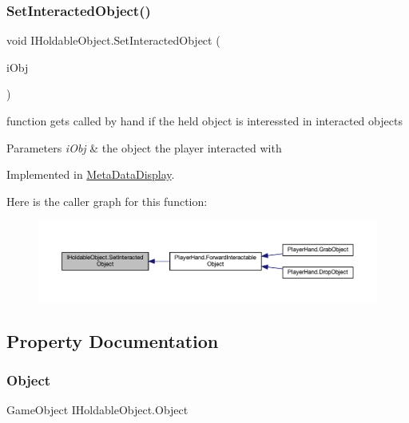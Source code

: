 \subsubsection{\texorpdfstring{Set\+Interacted\+Object()}{SetInteractedObject()}}
{\footnotesize\ttfamily void I\+Holdable\+Object.\+Set\+Interacted\+Object (\begin{DoxyParamCaption}\item[{\mbox{\hyperlink{interface_i_interactable}{I\+Interactable}}}]{i\+Obj }\end{DoxyParamCaption})}





function get\textquotesingle{}s called by hand if the held object is interessted in interacted objects 


\begin{DoxyParams}{Parameters}
{\em i\+Obj} & the object the player interacted with\\
\hline
\end{DoxyParams}


Implemented in \mbox{\hyperlink{class_meta_data_display_a29b7b1ec6193b73606dc7da89c387529}{Meta\+Data\+Display}}.

Here is the caller graph for this function\+:
\nopagebreak
\begin{figure}[H]
\begin{center}
\leavevmode
\includegraphics[width=350pt]{interface_i_holdable_object_aeb32a55273b99d16f9fb5b86f6a73f80_icgraph}
\end{center}
\end{figure}


\subsection{Property Documentation}
\mbox{\label{interface_i_holdable_object_a99b6760e4f5c71c79d8b084673a3818b}} 
\subsubsection{\texorpdfstring{Object}{Object}}
{\footnotesize\ttfamily Game\+Object I\+Holdable\+Object.\+Object\hspace{0.3cm}{\ttfamily [get]}}



